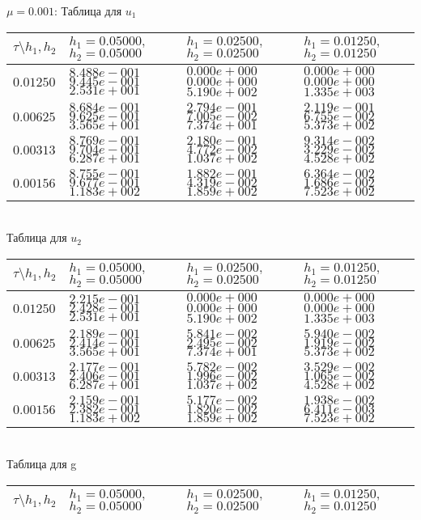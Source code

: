 \documentclass[a4paper]{article}
\theoremstyle{definition}
\numberwithin{equation}{section}
\begin{document}
\begin{center}

$\mu=0.001$: Таблица для $u_1$

\begin{tabular}{|p{0.8in}|p{1.2in}|p{1.2in}|p{1.2in}|} \hline
$\tau\setminus h_1, h_2$ & $h_1=0.05000 ,$ $h_2=0.05000$& $h_1=0.02500 ,$ $h_2=0.02500$& $h_1=0.01250 ,$ $h_2=0.01250$\\ \hline

$0.01250$ & $8.488e-001$ $9.445e-001$ $2.531e+001$ &$0.000e+000$ $0.000e+000$ $5.190e+002$ &$0.000e+000$ $0.000e+000$ $1.335e+003$  \\ \hline
$0.00625$ & $8.684e-001$ $9.625e-001$ $3.565e+001$ &$2.794e-001$ $7.005e-002$ $7.374e+001$ &$2.119e-001$ $6.755e-002$ $5.373e+002$  \\ \hline
$0.00313$ & $8.769e-001$ $9.704e-001$ $6.287e+001$ &$2.180e-001$ $4.772e-002$ $1.037e+002$ &$9.314e-002$ $3.229e-002$ $4.528e+002$  \\ \hline
$0.00156$ & $8.755e-001$ $9.677e-001$ $1.183e+002$ &$1.882e-001$ $4.319e-002$ $1.859e+002$ &$6.364e-002$ $1.686e-002$ $7.523e+002$  \\ \hline
\end{tabular}\\[20pt]
Таблица для $u_2$

\begin{tabular}{|p{0.8in}|p{1.2in}|p{1.2in}|p{1.2in}|} \hline
$\tau\setminus h_1, h_2$ & $h_1=0.05000 ,$ $h_2=0.05000$& $h_1=0.02500 ,$ $h_2=0.02500$& $h_1=0.01250 ,$ $h_2=0.01250$\\ \hline

$0.01250$ & $2.215e-001$ $2.428e-001$ $2.531e+001$ &$0.000e+000$ $0.000e+000$ $5.190e+002$ &$0.000e+000$ $0.000e+000$ $1.335e+003$  \\ \hline
$0.00625$ & $2.189e-001$ $2.414e-001$ $3.565e+001$ &$5.841e-002$ $2.495e-002$ $7.374e+001$ &$5.940e-002$ $1.919e-002$ $5.373e+002$  \\ \hline
$0.00313$ & $2.177e-001$ $2.406e-001$ $6.287e+001$ &$5.782e-002$ $1.996e-002$ $1.037e+002$ &$3.529e-002$ $1.065e-002$ $4.528e+002$  \\ \hline
$0.00156$ & $2.159e-001$ $2.382e-001$ $1.183e+002$ &$5.177e-002$ $1.820e-002$ $1.859e+002$ &$1.938e-002$ $6.411e-003$ $7.523e+002$  \\ \hline
\end{tabular}\\[20pt]
\newpage
Таблица для g
 
\begin{tabular}{|p{0.8in}|p{1.2in}|p{1.2in}|p{1.2in}|} \hline
$\tau\setminus h_1, h_2$ & $h_1=0.05000 ,$ $h_2=0.05000$& $h_1=0.02500 ,$ $h_2=0.02500$& $h_1=0.01250 ,$ $h_2=0.01250$ \\ \hline


\end{tabular}
\end{center}
\end{document}
